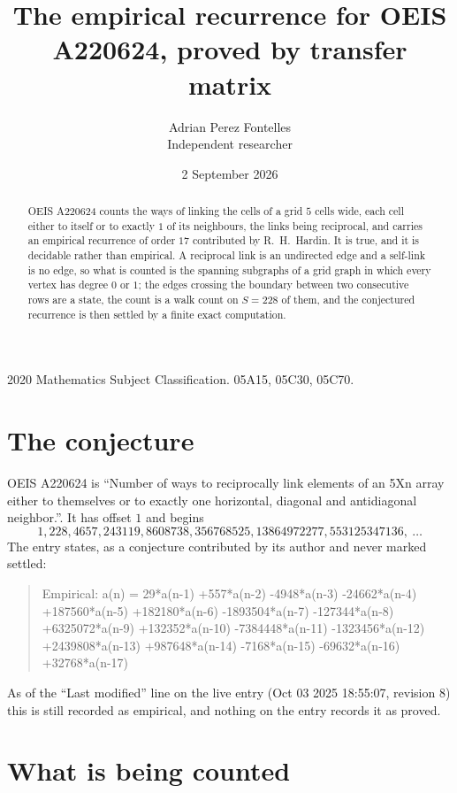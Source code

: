 \documentclass[11pt,a4paper]{article}
\title{The empirical recurrence for OEIS A220624, proved by transfer matrix}
\author{Adrian Perez Fontelles\\ \small Independent researcher}
\date{2 September 2026}
\theoremstyle{plain}
\theoremstyle{definition}
\begin{document}
\maketitle

\begin{abstract}
OEIS A220624 counts the ways of linking the cells of a grid $5$ cells wide, each cell either to
itself or to exactly $1$ of its neighbours, the links being reciprocal, and carries an
empirical recurrence of order $17$ contributed by R.~H.~Hardin. It is true, and it is
decidable rather than empirical. A reciprocal link is an undirected edge and a self-link is
no edge, so what is counted is the spanning subgraphs of a grid graph in which every vertex
has degree $0$ or $1$; the edges crossing the boundary between two consecutive rows are a
state, the count is a walk count on $S=228$ of them, and the conjectured recurrence is then
settled by a finite exact computation.
\end{abstract}

\noindent\small 2020 Mathematics Subject Classification. 05A15, 05C30, 05C70.\normalsize

\section{The conjecture}

OEIS A220624 is ``Number of ways to reciprocally link elements of an 5Xn array either to themselves or to exactly one horizontal, diagonal and antidiagonal neighbor.''. It has offset $1$ and begins
\[
1, 228, 4657, 243119, 8608738, 356768525, 13864972277, 553125347136,\ \dots
\]
The entry states, as a conjecture contributed by its author and never marked settled:
\begin{quote}
Empirical: a(n) = 29*a(n-1) +557*a(n-2) -4948*a(n-3) -24662*a(n-4) +187560*a(n-5) +182180*a(n-6) -1893504*a(n-7) -127344*a(n-8) +6325072*a(n-9) +132352*a(n-10) -7384448*a(n-11) -1323456*a(n-12) +2439808*a(n-13) +987648*a(n-14) -7168*a(n-15) -69632*a(n-16) +32768*a(n-17)
\end{quote}
As of the ``Last modified'' line on the live entry (Oct 03 2025 18:55:07, revision 8) this is still
recorded as empirical, and nothing on the entry records it as proved.

\section{What is being counted}
\end{document}
